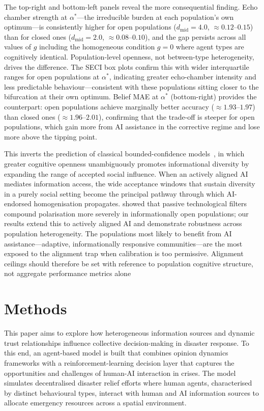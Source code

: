 \documentclass[pdflatex,sn-apa]{sn-jnl}%
\begin{document}
The top-right and bottom-left panels reveal the more
consequential finding. Echo chamber strength at
$\alpha^{*}$---the irreducible burden at each
population's own optimum---is consistently higher for
open populations ($d_{\mathrm{mid}} = 4.0$,
$\approx 0.12$--$0.15$) than for closed ones
($d_{\mathrm{mid}} = 2.0$, $\approx 0.08$--$0.10$),
and the gap persists across all values of $g$ including
the homogeneous condition $g = 0$ where agent types are
cognitively identical. Population-level openness, not
between-type heterogeneity, drives the difference.
The SECI box plots confirm this with wider
interquartile ranges for open populations at $\alpha^{*}$,
indicating greater echo-chamber intensity and less
predictable behaviour---consistent with these populations
sitting closer to the bifurcation at their own optimum.
Belief MAE at $\alpha^{*}$ (bottom-right) provides the
counterpart: open populations achieve marginally better
accuracy ($\approx 1.93$--$1.97$) than closed ones
($\approx 1.96$--$2.01$), confirming that the trade-off
is steeper for open populations, which gain more from
AI assistance in the corrective regime and lose more
above the tipping point.
 
This inverts the prediction of classical
bounded-confidence models~\citep{Hegselmann2002}, in
which greater cognitive openness unambiguously promotes
informational diversity by expanding the range of
accepted social influence. When an actively aligned AI
mediates information access, the wide acceptance windows
that sustain diversity in a purely social setting become
the principal pathway through which AI-endorsed
homogenisation propagates. \citet{geschke2019} showed
that passive technological filters compound polarisation
more severely in informationally open populations; our
results extend this to actively aligned AI and
demonstrate robustness across population heterogeneity.
The populations most likely to benefit from AI
assistance---adaptive, informationally responsive
communities---are the most exposed to the alignment
trap when calibration is too permissive. Alignment
ceilings should therefore be set with reference to
population cognitive structure, not aggregate
performance metrics alone

\section{Methods}

This paper aims to explore how heterogeneous information sources and dynamic trust
relationships influence collective decision-making in disaster response.
To this end, an agent-based model is built that combines opinion dynamics frameworks
with a reinforcement-learning decision layer that captures the opportunities and
challenges of human-AI interaction in crises.
The model simulates decentralised disaster relief efforts where human agents,
characterised by distinct behavioural types, interact with human and AI information
sources to allocate emergency resources across a spatial environment.
\end{document}
